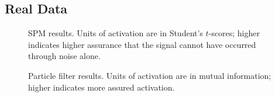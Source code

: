 \documentclass[journal]{./IEEEtran}
\begin{document}
\subsection{Real Data}
\begin{figure}
\centering
{}
\caption{SPM results. Units of activation are in Student's $t$-scores; higher indicates higher
        assurance that the signal cannot have occurred through noise alone.}
\label{fig:hm_canon_spm}
\end{figure}

\begin{figure}
\centering
{}
\caption{Particle filter results. Units of activation are in mutual information; higher
    indicates more assured activation.}
\label{fig:hm_mi_res}
\end{figure}
\end{document}
